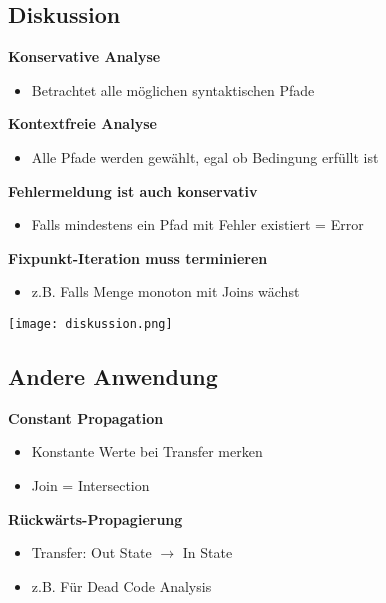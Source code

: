 \subsection{Diskussion}
\textbf{Konservative Analyse}
\begin{itemize}
    \item Betrachtet alle möglichen syntaktischen Pfade
\end{itemize}
\textbf{Kontextfreie Analyse}
\begin{itemize}
    \item Alle Pfade werden gewählt, egal ob Bedingung erfüllt ist
\end{itemize}
\textbf{Fehlermeldung ist auch konservativ}
\begin{itemize}
    \item Falls mindestens ein Pfad mit Fehler existiert = Error
\end{itemize}
\textbf{Fixpunkt-Iteration muss terminieren}
\begin{itemize}
    \item z.B. Falls Menge monoton mit Joins wächst
\end{itemize}
\texttt{[image: diskussion.png]}

\subsection{Andere Anwendung}
\textbf{Constant Propagation}
\begin{itemize}
    \item Konstante Werte bei Transfer merken
    \item Join = Intersection
\end{itemize}
\textbf{Rückwärts-Propagierung}
\begin{itemize}
    \item Transfer: Out State $\rightarrow$ In State
    \item z.B. Für Dead Code Analysis
\end{itemize}